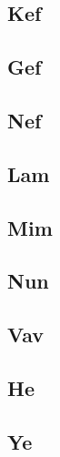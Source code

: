 \subsection*{Kef}
\uyumluharftablo{\arkef}{\latupkef\latdownkef}{\isimkef}{\trtlfkef}

\subsection*{Gef}
\uyumluharftablo{\argef}{\latupgef\latdowngef}{\isimgef}{\trtlfgef}

\subsection*{Nef}
\uyumluharftablo{\arnef}{\latupnef\latdownnef}{\isimnef}{\trtlfnef}

\subsection*{Lam}
\uyumluharftablo{\arlam}{\latuplam\latdownlam}{\isimlam}{\trtlflam}

\subsection*{Mim}
\uyumluharftablo{\armim}{\latupmim\latdownmim}{\isimmim}{\trtlfmim}

\subsection*{Nun}
\uyumluharftablo{\arnun}{\latupnun\latdownnun}{\isimnun}{\trtlfnun}

\subsection*{Vav}
\uyumluharftablo{\arvav}{\latupvav\latdownvav}{\isimvav}{\trtlfvav}

\subsection*{He}
\uyumluharftablo{\arhe}{\latuphe\latdownhe}{\isimhe}{\trtlfhe}

\subsection*{Ye}
\uyumluharftablo{\arye}{\latupye\latdownye}{\isimye}{\trtlfye}



